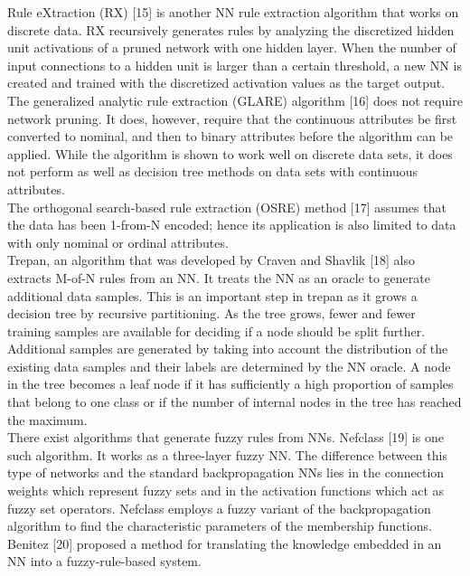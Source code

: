 \documentclass[a4paper,14pt,onecolumn]{article}
\begin{document}
       Rule eXtraction (RX) [15] is another NN rule extraction algorithm that works on discrete data. RX recursively generates rules by analyzing the discretized hidden unit activations of a pruned network with one hidden layer. When the number of input connections to a hidden unit is larger than a certain threshold, a new NN is created and trained with the discretized activation values as the target output. \\
     The generalized analytic rule extraction (GLARE) algorithm [16] does not require network pruning. It does, however, require that the continuous attributes be first converted to nominal, and then to binary attributes before the algorithm can be applied. While the algorithm is shown to work well on discrete data sets, it does not perform as well as decision tree methods on data sets with continuous attributes. \\
     The orthogonal search-based rule extraction (OSRE) method [17] assumes that the data has been 1-from-N encoded; hence its application is also limited to data with only nominal or ordinal attributes. \\
    Trepan, an algorithm that was developed by Craven and Shavlik [18] also extracts M-of-N rules from an NN. It treats the NN as an oracle to generate additional data samples. This is an important step in trepan as it grows a decision tree by recursive partitioning. As the tree grows, fewer and fewer training samples are available for deciding if a node should be split further. Additional samples are generated by taking into account the distribution of the existing data samples and their labels are determined by the NN oracle. A node in the tree becomes a leaf node if it has sufficiently a high proportion of samples that belong to one class or if the number of internal nodes in the tree has reached the maximum.\\
    There exist algorithms that generate fuzzy rules from NNs. Nefclass [19] is one such algorithm. It works as a three-layer fuzzy NN. The difference between this type of networks and the standard backpropagation NNs lies in the connection weights which represent fuzzy sets and in the activation functions which act as fuzzy set operators. Nefclass employs a fuzzy variant of the backpropagation algorithm to find the characteristic parameters of the membership functions.\\
    Benitez [20] proposed a method for translating the knowledge embedded in an NN into a fuzzy-rule-based system.\\
\end{document}

